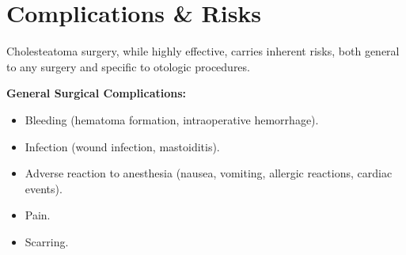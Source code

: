 \section*{Complications \& Risks}
Cholesteatoma surgery, while highly effective, carries inherent risks, both general to any surgery and specific to otologic procedures.

\textbf{General Surgical Complications:}
\begin{itemize}
  \item Bleeding (hematoma formation, intraoperative hemorrhage).
  
  \item Infection (wound infection, mastoiditis).
  
  \item Adverse reaction to anesthesia (nausea, vomiting, allergic reactions, cardiac events).
  
  \item Pain.
  
  \item Scarring.
\end{itemize}

